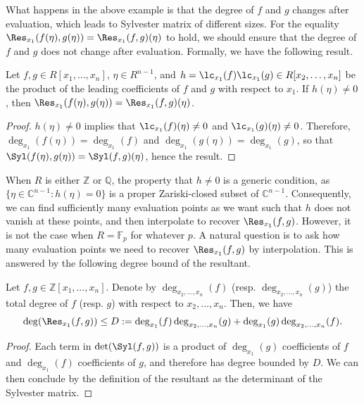 What happens in the above example is that the degree of $f$ and $g$ changes after evaluation, which leads to Sylvester matrix of different sizes. For the equality $\Res_{x_1}(f(\eta),g(\eta))=\Res_{x_1}(f,g)(\eta)$ to hold, we should ensure that the degree of $f$ and $g$ does not change after evaluation. Formally, we have the following result.

\begin{proposition}
    Let $f,g\in R[x_1,\dots,x_n]$, $\eta\in R^{n-1}$, and $h=\lc_{x_1}(f)\lc_{x_1}(g)\in R[x_2,\dots,x_n]$ be the product of the leading coefficients of $f$ and $g$ with respect to $x_1$. If $h(\eta)\neq 0$, then $\Res_{x_1}(f(\eta),g(\eta))=\Res_{x_1}(f,g)(\eta)$.
\end{proposition}

\begin{proof}
    $h(\eta)\neq 0$ implies that $\lc_{x_1}(f)(\eta)\neq 0$ and $\lc_{x_1}(g)(\eta)\neq 0$. Therefore, $\deg_{x_1}(f(\eta))=\deg_{x_1}(f)$ and $\deg_{x_1}(g(\eta))=\deg_{x_1}(g)$, so that $\Syl(f(\eta),g(\eta))=\Syl(f,g)(\eta)$, hence the result.
\end{proof}

When $R$ is either $\mathbb{Z}$ or $\mathbb{Q}$, the property that $h\neq 0$ is a generic condition, as $\lbrace\eta\in\mathbb{C}^{n-1} : h(\eta)=0\rbrace$ is a proper Zariski-closed subset of $\mathbb{C}^{n-1}$. Consequently, we can find sufficiently many evaluation points as we want such that $h$ does not vanish at these points, and then interpolate to recover $\Res_{x_1}(f,g)$. However, it is not the case when $R=\mathbb{F}_p$ for whatever $p$. A natural question is to ask how many evaluation points we need to recover $\Res_{x_1}(f,g)$ by interpolation. This is answered by the following degree bound of the resultant.

\begin{proposition}
    Let $f,g\in\mathbb{Z}[x_1,\dots,x_n]$. Denote by $\deg_{x_2,\dots,x_n}(f)$ (resp. $\deg_{x_2,\dots,x_n}(g)$) the total degree of $f$ (resp. $g$) with respect to $x_2,\dots,x_n$. Then, we have
    \begin{equation*}
        \deg(\Res_{x_1}(f,g)) \leq D := \deg_{x_1}(f)\deg_{x_2,\dots,x_n}(g) + \deg_{x_1}(g)\deg_{x_2,\dots,x_n}(f).
    \end{equation*}
\end{proposition}

\begin{proof}
    Each term in $\det(\Syl(f,g))$ is a product of $\deg_{x_1}(g)$ coefficients of $f$ and $\deg_{x_1}(f)$ coefficients of $g$, and therefore has degree bounded by $D$. We can then conclude by the definition of the resultant as the determinant of the Sylvester matrix.
\end{proof}

